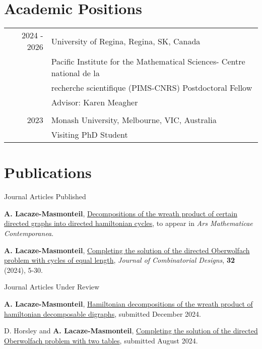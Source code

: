 \documentclass[letter,12pt]{article} %
\begin{document}
\section{Academic Positions}

\vspace{3mm}
 
{\raggedleft
\begin{tabular}{r | l}
 2024 - 2026 &University of Regina, Regina, SK, Canada  \\
&Pacific Institute for the Mathematical Sciences- Centre national de la\\
& recherche scientifique (PIMS-CNRS)  Postdoctoral Fellow \\
&Advisor: Karen Meagher \\
\multicolumn{1}{c}{} &\multicolumn{1}{c}{} \\
 2023 &Monash University, Melbourne, VIC, Australia  \\
& Visiting PhD Student \\
\end{tabular}
}


\section{Publications}
\vspace{3mm}
Journal Articles Published
\begin{enumerate}[label={[\arabic*]}]
\item {\bf A. Lacaze-Masmonteil}, \href{https://arxiv.org/abs/2410.02109}{Decompositions of the wreath product of certain directed graphs into directed hamiltonian cycles}, to appear in \textit{Ars Mathematicae Contemporanea}.
\item  {\bf A. Lacaze-Masmonteil}, \href{https://onlinelibrary.wiley.com/doi/abs/10.1002/jcd.21918}{Completing the solution of the directed Oberwolfach problem with cycles of equal length}, \textit{Journal of Combinatorial Designs}, {\bf 32} (2024), 5-30.
\end{enumerate}

Journal Articles Under Review

\begin{enumerate}[resume, label={[\arabic*]}]
\item {\bf A. Lacaze-Masmonteil},  \href{https://arxiv.org/abs/2412.13392}{Hamiltonian decompositions of the wreath product of hamiltonian decomposable digraphs}, submitted December 2024.%
\pagebreak
\item D. Horsley and {\bf A. Lacaze-Masmonteil}, \href{https://arxiv.org/abs/2408.10448}{Completing the solution of the directed Oberwolfach problem with two tables}, submitted August 2024.%
\end{enumerate}
\end{document}
